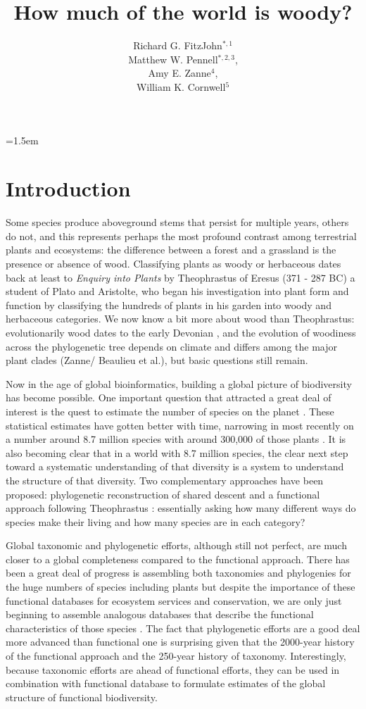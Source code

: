 \documentclass[12pt]{article}
\title{How much of the world is woody?}
\author{
Richard G. FitzJohn$^{*,1}$\\ Matthew W. Pennell$^{*,2,3}$,\\ Amy E. Zanne$^{4}$,\\ William K. Cornwell$^{5}$
}
\date{}
\affiliation{\noindent
$^*$ These authors contributed equally}
\begin{document}
\mstitlepage
\parindent=1.5em
\addtolength{\parskip}{.3em}

\section{Introduction}

Some species produce aboveground stems that persist for multiple years, others do not, and this represents perhaps the most profound contrast among terrestrial plants and ecosystems: the difference between a forest and a grassland is the presence or absence of wood. Classifying plants as woody or herbaceous dates back at least to \textit{Enquiry into Plants} by Theophrastus of Eresus (371 - 287 BC) a student of Plato and Aristolte, who began his investigation into plant form and function by classifying the hundreds of plants in his garden into woody and herbaceous categories.  We now know a bit more about wood than Theophrastus: evolutionarily wood dates to the early Devonian \citep[~400 mya;][]{gerrienne2011simple}, and the evolution of woodiness across the phylogenetic tree depends on climate and differs among the major plant clades (Zanne/ Beaulieu et al.), but basic questions still remain.

Now in the age of global bioinformatics, building a global picture of biodiversity has become possible.  One important question that attracted a great deal of interest is the quest to estimate the number of species on the planet \citep{may1988many,erwin1991many, stork1993many, mora2011plos}.  These statistical estimates have gotten better with time, narrowing in most recently on a number around 8.7 million species with around 300,000 of those plants \citep{mora2011plos}.  It is also becoming clear that in a world with 8.7 million species, the clear next step toward a systematic understanding of that diversity is a system to understand the structure of that diversity.  Two complementary approaches have been proposed: phylogenetic reconstruction of shared descent \citep{smith2011understanding} and a functional approach following Theophrastus \citep[more recently in the tradition of][]{grime1979plant, weiher2009challenging, westoby2002plant}: essentially asking how many different ways do species make their living and how many species are in each category?

Global taxonomic and phylogenetic efforts, although still not perfect, are much closer to a global completeness compared to the functional approach.   There has been a great deal of progress is assembling both taxonomies and phylogenies for the huge numbers of species including plants \citep[e.g.][]{smith2011understanding} but despite the importance of these functional databases for ecosystem services and conservation, we are only just beginning to assemble analogous databases that describe the functional characteristics of those species \citep{Kattge2011TRY}.   The fact that phylogenetic efforts are a good deal more advanced than functional one is surprising given that the 2000-year history of the functional approach and the 250-year history of taxonomy.  Interestingly, because taxonomic efforts are ahead of functional efforts, they can be used in combination with functional database to formulate estimates of the global structure of functional biodiversity.
\end{document}

